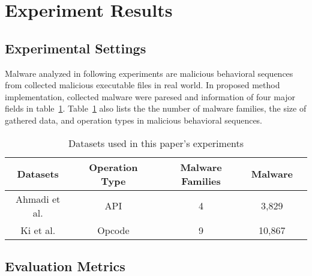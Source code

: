 \section{Experiment Results}

{\color{red}{Tony, pliz write overview here!!!}}

\subsection{Experimental Settings}

{\color{red}{Tony, pliz write like the followings in this subsection!}}

Malware analyzed in following experiments are malicious behavioral sequences from collected malicious executable files in real world.  In proposed method implementation, collected malware were paresed and information of four major fields in table~\ref{tbl:db_01}. Table~\ref{tbl:db_01} also lists the the number of malware families, the size of gathered data, and operation types in malicious behavioral sequences. 

\begin{table}[]
\centering
\caption{Datasets used in this paper's experiments}
\label{tbl:db_01}
\begin{tabular}{lllll}
\\\hline\hline
 \multicolumn{1}{c|}{Datasets} & \multicolumn{1}{c|}{Operation Type}   & \multicolumn{1}{c|}{Malware Families} &   \multicolumn{1}{c|}{Malware}    \\\hline
\multicolumn{1}{c|}{Ahmadi et al. \cite{ahmadi2016novel}} & \multicolumn{1}{c|}{API}              & \multicolumn{1}{c|}{4}  &  \multicolumn{1}{c|}{3,829}                  \\\hline
\multicolumn{1}{c|}{Ki et al. \cite{ki2015novel}} & \multicolumn{1}{c|}{Opcode}            & \multicolumn{1}{c|}{9}  &  \multicolumn{1}{c|}{10,867}                 \\\hline\hline
\end{tabular}
\end{table}

\subsection{Evaluation Metrics}

{\color{red}{Tony, pliz replace malware to fingerprint!!!}}

